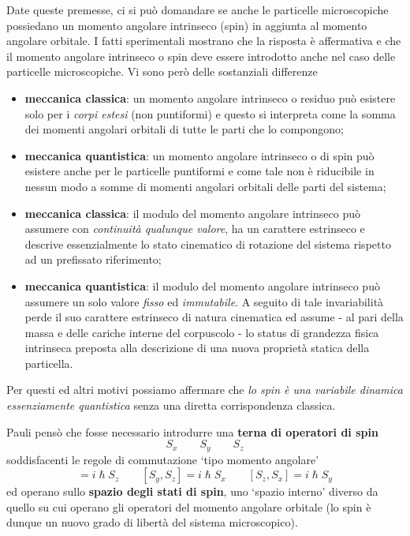 Date queste premesse, ci si può domandare se anche le particelle
microscopiche possiedano un momento angolare intrinseco (spin) in
aggiunta al momento angolare orbitale.
I fatti sperimentali mostrano che
la risposta è affermativa e che il momento angolare intrinseco o spin
deve essere introdotto anche nel caso delle particelle microscopiche.
Vi
sono però delle sostanziali differenze

\begin{itemize}
    \tightlist
    \item
    \textbf{meccanica classica}: un momento angolare intrinseco o residuo
    può esistere solo per i \emph{corpi estesi} (non puntiformi) e questo
    si interpreta come la somma dei momenti angolari orbitali di tutte le
    parti che lo compongono;
    \item
    \textbf{meccanica quantistica}: un momento angolare intrinseco o di
    spin può esistere anche per le particelle puntiformi e come tale non è
    riducibile in nessun modo a somme di momenti angolari orbitali delle
    parti del sistema;
    \item
    \textbf{meccanica classica}: il modulo del momento angolare intrinseco
    può assumere con \emph{continuità qualunque valore}, ha un carattere
    estrinseco e descrive essenzialmente lo stato cinematico di rotazione
    del sistema rispetto ad un prefissato riferimento;
    \item
    \textbf{meccanica quantistica}: il modulo del momento angolare
    intrinseco può assumere un solo valore \emph{fisso} ed
    \emph{immutabile}.
    A seguito di tale invariabilità perde il suo
    carattere estrinseco di natura cinematica ed assume - al pari della
    massa e delle cariche interne del corpuscolo - lo status di grandezza
    fisica intrinseca preposta alla descrizione di una nuova proprietà
    statica della particella.
\end{itemize}

Per questi ed altri motivi possiamo affermare che \emph{lo spin è una
variabile dinamica essenziamente quantistica} senza una diretta
corrispondenza classica.

Pauli pensò che fosse necessario introdurre una \textbf{terna di
operatori di spin} \[
                       S_{x} \qquad S_{y} \qquad S_{z}
\] soddisfacenti le regole di commutazione `tipo momento angolare'
\begin{equation}
[ S_{x},S_{y}] = i \hslash S_{z} \qquad  [ S_{y},S_{z}] = i \hslash S_{x} \qquad   [ S_{z},S_{x}] = i \hslash S_{y}
\label{eq:commutators-spin-operator}
\end{equation}
ed operano sullo \textbf{spazio degli stati di spin}, uno `spazio
interno' diverso da quello su cui operano gli operatori del momento
angolare orbitale (lo spin è dunque un nuovo grado di libertà del
sistema microscopico).

